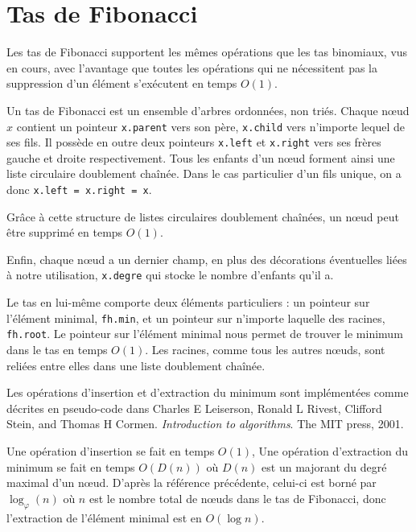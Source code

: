 \documentclass{article}
\begin{document}
\section{Tas de Fibonacci}\label{sec:tas-de-fibonacci}
  Les tas de Fibonacci supportent les mêmes opérations que les tas binomiaux, vus en cours, avec l'avantage que toutes les opérations qui ne nécessitent pas la suppression d'un élément s'exécutent en temps $O(1)$.

  Un tas de Fibonacci est un ensemble d'arbres ordonnées, non triés. Chaque nœud $x$ contient un pointeur \texttt{x.parent} vers son père, \texttt{x.child} vers n'importe lequel de ses fils. Il possède en outre deux pointeurs \texttt{x.left} et \texttt{x.right} vers ses frères gauche et droite respectivement. Tous les enfants d'un nœud forment ainsi une liste circulaire doublement chaînée. Dans le cas particulier d'un fils unique, on a donc \texttt{x.left = x.right = x}.

  Grâce à cette structure de listes circulaires doublement chaînées, un nœud peut être supprimé en temps $O(1)$.

  Enfin, chaque nœud a un dernier champ, en plus des décorations éventuelles liées à notre utilisation, \texttt{x.degre} qui stocke le nombre d'enfants qu'il a.

  Le tas en lui-même comporte deux éléments particuliers : un pointeur sur l'élément minimal, \texttt{fh.min}, et un pointeur sur n'importe laquelle des racines, \texttt{fh.root}. Le pointeur sur l'élément minimal nous permet de trouver le minimum dans le tas en temps $O(1)$. Les racines, comme tous les autres nœuds, sont reliées entre elles dans une liste doublement chaînée.

  Les opérations d'insertion et d'extraction du minimum sont implémentées comme décrites en pseudo-code dans Charles E Leiserson, Ronald L Rivest, Clifford Stein, and Thomas H Cormen. \emph{Introduction to algorithms}. The MIT press, 2001.

  Une opération d'insertion se fait en temps $O(1)$, Une opération d'extraction du minimum se fait en temps $O(D(n))$ où $D(n)$ est un majorant du degré maximal d'un nœud. D'après la référence précédente, celui-ci est borné par $\log_\varphi \left(n\right)$ où $n$ est le nombre total de nœuds dans le tas de Fibonacci, donc l'extraction de l'élément minimal est en $O(\log n)$.
\end{document}
